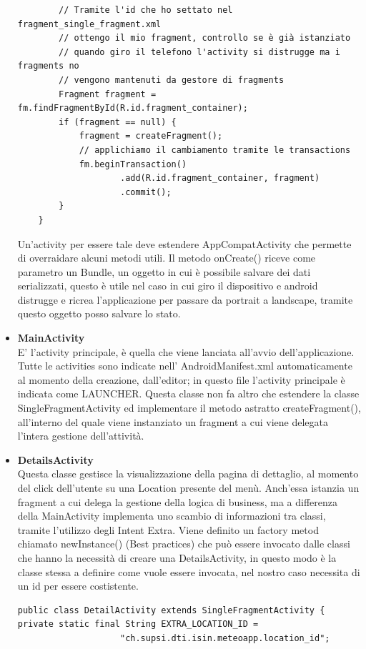 \documentclass{article}
\begin{document}
\begin{itemize}
\begin{lstlisting}
        // Tramite l'id che ho settato nel fragment_single_fragment.xml 
        // ottengo il mio fragment, controllo se è già istanziato
        // quando giro il telefono l'activity si distrugge ma i fragments no
        // vengono mantenuti da gestore di fragments
        Fragment fragment = fm.findFragmentById(R.id.fragment_container);
        if (fragment == null) {
            fragment = createFragment();
            // applichiamo il cambiamento tramite le transactions
            fm.beginTransaction()
                    .add(R.id.fragment_container, fragment)
                    .commit();
        }
    }
    \end{lstlisting}
    Un'activity per essere tale deve estendere AppCompatActivity che permette di overraidare alcuni metodi utili.
    Il metodo onCreate() riceve come parametro un Bundle, un oggetto in cui è possibile salvare dei dati serializzati, questo è utile nel caso in cui giro il dispositivo
    e android distrugge e ricrea l'applicazione per passare da portrait a landscape, tramite questo oggetto posso salvare lo stato.
    \item \textbf{MainActivity} \\
    E' l'activity principale, è quella che viene lanciata all'avvio dell'applicazione. Tutte le activities sono indicate nell' AndroidManifest.xml
    automaticamente al momento della creazione, dall'editor; in questo file l'activity principale è indicata come LAUNCHER.
    Questa classe non fa altro che estendere la classe SingleFragmentActivity ed implementare il metodo astratto
    createFragment(), all'interno del quale viene instanziato un fragment a cui viene delegata l'intera gestione dell'attività.
    \item \textbf{DetailsActivity} \\
    Questa classe gestisce la visualizzazione della pagina di dettaglio, al momento del click dell'utente su una Location presente del menù.
    Anch'essa istanzia un fragment a cui delega la gestione della logica di business, ma a differenza della MainActivity implementa uno scambio di informazioni tra classi, tramite 
    l'utilizzo degli Intent Extra. Viene definito un factory metod chiamato newInstance() (Best practices) che può essere invocato dalle classi che hanno la necessità di 
    creare una DetailsActivity, in questo modo è la classe stessa a definire come vuole essere invocata, nel nostro caso necessita di un id per essere costistente.
    \begin{lstlisting}
public class DetailActivity extends SingleFragmentActivity {
private static final String EXTRA_LOCATION_ID = 
                    "ch.supsi.dti.isin.meteoapp.location_id";


\end{lstlisting}
\end{itemize}
\end{document}

